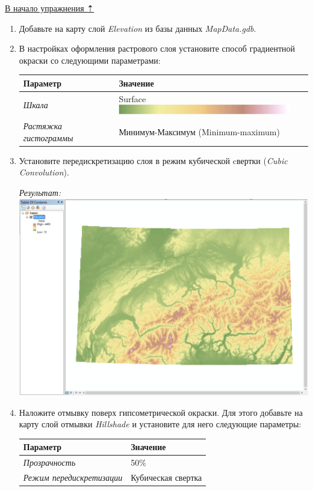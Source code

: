 \documentclass[12pt,]{book}
\begin{document}
\protect\hyperlink{map-design-general}{В начало упражнения ⇡}

\begin{enumerate}
\def\labelenumi{\arabic{enumi}.}
\item
  Добавьте на карту слой \emph{Elevation} из базы данных \emph{MapData.gdb}.
\item
  В настройках оформления растрового слоя установите способ градиентной окраски со следующими параметрами:

  \begin{longtable}[]{@{}ll@{}}
  \toprule
  Параметр & Значение\tabularnewline
  \midrule
  \endhead
  \emph{Шкала} & Surface \includegraphics{images/Ex02/image11.png}\tabularnewline
  \emph{Растяжка гистограммы} & Минимум-Максимум (Minimum-maximum)\tabularnewline
  \bottomrule
  \end{longtable}
\item
  Установите передискретизацию слоя в режим кубической cвертки (\emph{Cubic Convolution}).

  \emph{Результат:}
  \includegraphics{images/Ex02/image12.png}
\item
  Наложите отмывку поверх гипсометрической окраски. Для этого добавьте на карту слой отмывки \emph{Hillshade} и установите для него следующие параметры:

  \begin{longtable}[]{@{}ll@{}}
  \toprule
  Параметр & Значение\tabularnewline
  \midrule
  \endhead
  \emph{Прозрачность} & 50\%\tabularnewline
  \emph{Режим передискретизации} & Кубическая свертка\tabularnewline
  \bottomrule
  \end{longtable}


\end{enumerate}
\end{document}
